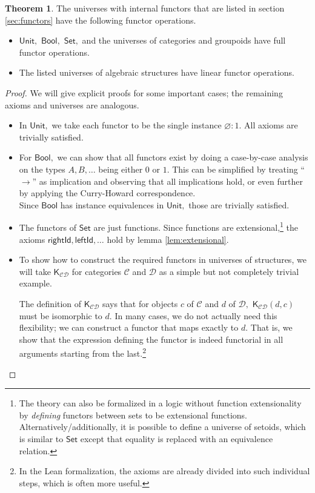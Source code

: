 \documentclass[a4paper]{article}
\theoremstyle{definition}
\newtheorem{theorem}[definition]{Theorem}
\theoremstyle{remark}
\renewcommand{\emptyset}{\varnothing}
\newcommand{\C}{\mathcal{C}}
\newcommand{\D}{\mathcal{D}}
\newcommand{\nm}{\mathsf}
\newcommand{\universe}{\nm}
\newcommand{\Unit}{\universe{Unit}}
\newcommand{\Bool}{\universe{Bool}}
\newcommand{\Set}{\universe{Set}}
\newcommand{\combinator}{\nm}
\newcommand{\constFun}{\combinator{K}}
\begin{document}
\begin{theorem}
  \label{thm:funop}
  The universes with internal functors that are listed in section \ref{sec:functors} have the
  following functor operations.
  \begin{itemize}
    \item $\Unit,$ $\Bool,$ $\Set,$ and the universes of categories and groupoids have
    full functor operations.
    \item The listed universes of algebraic structures have linear functor operations.
  \end{itemize}
\end{theorem}

\begin{proof}
  We will give explicit proofs for some important cases; the remaining axioms and
  universes are analogous.
  \begin{itemize}
    \item In $\Unit,$ we take each functor to be the single instance $\emptyset : 1.$
    All axioms are trivially satisfied.
    \item For $\Bool,$ we can show that all functors exist by doing a case-by-case
    analysis on the types $A,B,\ldots$ being either $0$ or $1.$ This can be simplified by
    treating ``$\to$'' as implication and observing that all implications hold, or even
    further by applying the Curry-Howard correspondence\cite{curry-howard}.\\
    Since $\Bool$ has instance equivalences in $\Unit,$ those are trivially satisfied.
    \item The functors of $\Set$ are just functions. Since functions are
    extensional,\footnote{The theory can also be formalized in a logic without function
    extensionality by \emph{defining} functors between sets to be extensional functions.
    Alternatively/additionally, it is possible to define a universe of setoids, which
    is similar to $\Set$ except that equality is replaced with an equivalence relation.}
    the axioms $\nm{rightId},\nm{leftId},\ldots$ hold by lemma \ref{lem:extensional}.
    \item To show how to construct the required functors in universes of
    structures, we will take $\constFun_{\C\D}$ for categories $\C$ and $\D$ as a
    simple but not completely trivial example.

    The definition of $\constFun_{\C\D}$ says that for objects $c$ of $\C$ and $d$ of
    $\D,$ $\constFun_{\C\D}(d,c)$ must be isomorphic to $d.$ In many cases, we do not
    actually need this flexibility; we can construct a functor that maps exactly to
    $d.$ That is, we show that the expression defining the functor is indeed functorial
    in all arguments starting from the last.\footnote{In the Lean formalization, the
    axioms are already divided into such individual steps, which is often more useful.}


\end{itemize}
\end{proof}
\end{document}
